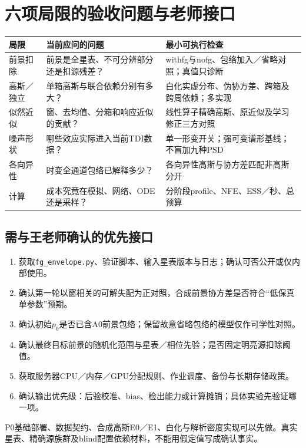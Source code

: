 \documentclass[UTF8,fontset=none,a4paper,11pt]{ctexart}
\newcommand{\code}[1]{\texttt{\nolinkurl{#1}}}
\begin{document}
\section{六项局限的验收问题与老师接口}
\begin{longtable}{p{26mm}p{57mm}p{67mm}}\toprule
局限 & 当前应问的问题 & 最小可执行检查\\\midrule
前景扣除 & 前景是全星表、不可分辨部分还是扣源残差？ & withfg与nofg、包络加入／省略对照；真值只诊断\\
高斯／独立 & 单箱高斯与联合依赖分别有多大？ & 白化实虚分布、伪协方差、跨箱及跨周依赖；多实现\\
似然近似 & 窗、去均值、分箱和响应近似的贡献？ & 线性算子精确高斯、原近似及学习修正三方对照\\
噪声形状 & 哪些效应实际进入当前TDI数据？ & 单一形变开关；强可变谱形基线；不盲加九种PSD\\
各向异性 & 时变全通道包络已解释多少？ & 各向异性高斯与协方差匹配非高斯分开\\
计算 & 成本究竟在模拟、网络、ODE还是采样？ & 分阶段profile、NFE、ESS／秒、总预算\\\bottomrule
\end{longtable}
\subsection{需与王老师确认的优先接口}
\begin{enumerate}
\item 获取\code{fg_envelope.py}、验证脚本、输入星表版本与日志；确认可否公开或仅内部使用。
\item 确认第一轮以窗相关的可解失配为正对照，合成前景协方差是否符合“低保真单参数”预期。
\item 确认初始$p_0$是否已含A0前景包络；保留故意省略包络的模型仅作可学性对照。
\item 确认最终目标前景的随机化范围与星表／相位先验；是否固定明亮源扣除阈值。
\item 获取服务器CPU／内存／GPU分配规则、作业调度、备份与长期存储政策。
\item 确认输出优先级：后验校准、bias、检出能力或计算摊销；具体实验先验证哪一项。
\end{enumerate}
\begin{keybox}[无需等待这些答案的工作]
P0基础部署、数据契约、合成高斯E0／E1、白化与解析密度实现可以先做。真实星表、精确源族群及blind配置依赖材料，不能用假定值写成确认事实。
\end{keybox}
\clearpage
\end{document}
